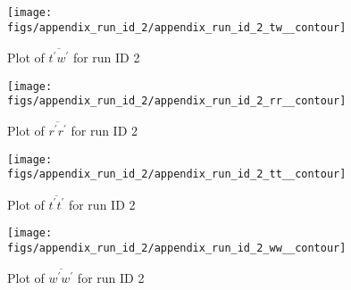 \begin{figure}[H]
\centering
\texttt{[image: figs/appendix\_run\_id\_2/appendix\_run\_id\_2\_tw\_\_contour]}
\caption{Plot of $\overline{t^\prime w^\prime}$ for run ID 2}
\label{fig:appendix_run_id_2_tw__contour}
\end{figure}


\begin{figure}[H]
\centering
\texttt{[image: figs/appendix\_run\_id\_2/appendix\_run\_id\_2\_rr\_\_contour]}
\caption{Plot of $\overline{r^\prime r^\prime}$ for run ID 2}
\label{fig:appendix_run_id_2_rr__contour}
\end{figure}


\begin{figure}[H]
\centering
\texttt{[image: figs/appendix\_run\_id\_2/appendix\_run\_id\_2\_tt\_\_contour]}
\caption{Plot of $\overline{t^\prime t^\prime}$ for run ID 2}
\label{fig:appendix_run_id_2_tt__contour}
\end{figure}


\begin{figure}[H]
\centering
\texttt{[image: figs/appendix\_run\_id\_2/appendix\_run\_id\_2\_ww\_\_contour]}
\caption{Plot of $\overline{w^\prime w^\prime}$ for run ID 2}
\label{fig:appendix_run_id_2_ww__contour}
\end{figure}


